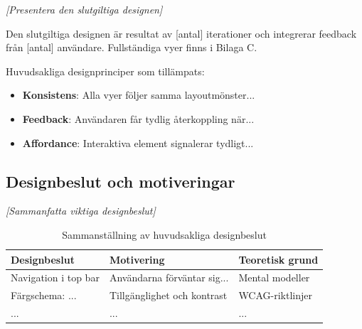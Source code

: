 \textit{[Presentera den slutgiltiga designen]}

Den slutgiltiga designen är resultat av [antal] iterationer och integrerar feedback från [antal] användare. Fullständiga vyer finns i Bilaga C.

Huvudsakliga designprinciper som tillämpats:
\begin{itemize}
    \item \textbf{Konsistens}: Alla vyer följer samma layoutmönster...
    \item \textbf{Feedback}: Användaren får tydlig återkoppling när...
    \item \textbf{Affordance}: Interaktiva element signalerar tydligt...
\end{itemize}




\subsection{Designbeslut och motiveringar}

\textit{[Sammanfatta viktiga designbeslut]}

\begin{table}[h]
\centering
\begin{tabular}{|p{4cm}|p{5cm}|p{4cm}|}
\hline
\textbf{Designbeslut} & \textbf{Motivering} & \textbf{Teoretisk grund} \\
\hline
Navigation i top bar & Användarna förväntar sig... & Mental modeller \cite{sharp2019} \\
\hline
Färgschema: ... & Tillgänglighet och kontrast & WCAG-riktlinjer \\
\hline
... & ... & ... \\
\hline
\end{tabular}
\caption{Sammanställning av huvudsakliga designbeslut}
\end{table}
